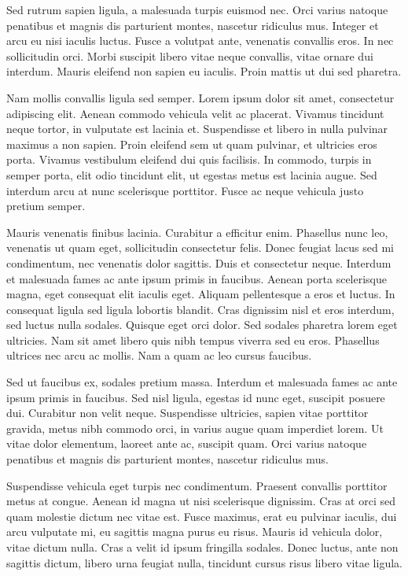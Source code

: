 Sed rutrum sapien ligula, a malesuada turpis euismod nec. Orci varius natoque penatibus et magnis dis parturient montes, nascetur ridiculus mus. Integer et arcu eu nisi iaculis luctus. Fusce a volutpat ante, venenatis convallis eros. In nec sollicitudin orci. Morbi suscipit libero vitae neque convallis, vitae ornare dui interdum. Mauris eleifend non sapien eu iaculis. Proin mattis ut dui sed pharetra.

Nam mollis convallis ligula sed semper. Lorem ipsum dolor sit amet, consectetur adipiscing elit. Aenean commodo vehicula velit ac placerat. Vivamus tincidunt neque tortor, in vulputate est lacinia et. Suspendisse et libero in nulla pulvinar maximus a non sapien. Proin eleifend sem ut quam pulvinar, et ultricies eros porta. Vivamus vestibulum eleifend dui quis facilisis. In commodo, turpis in semper porta, elit odio tincidunt elit, ut egestas metus est lacinia augue. Sed interdum arcu at nunc scelerisque porttitor. Fusce ac neque vehicula justo pretium semper.

Mauris venenatis finibus lacinia. Curabitur a efficitur enim. Phasellus nunc leo, venenatis ut quam eget, sollicitudin consectetur felis. Donec feugiat lacus sed mi condimentum, nec venenatis dolor sagittis. Duis et consectetur neque. Interdum et malesuada fames ac ante ipsum primis in faucibus. Aenean porta scelerisque magna, eget consequat elit iaculis eget. Aliquam pellentesque a eros et luctus. In consequat ligula sed ligula lobortis blandit. Cras dignissim nisl et eros interdum, sed luctus nulla sodales. Quisque eget orci dolor. Sed sodales pharetra lorem eget ultricies. Nam sit amet libero quis nibh tempus viverra sed eu eros. Phasellus ultrices nec arcu ac mollis. Nam a quam ac leo cursus faucibus.

Sed ut faucibus ex, sodales pretium massa. Interdum et malesuada fames ac ante ipsum primis in faucibus. Sed nisl ligula, egestas id nunc eget, suscipit posuere dui. Curabitur non velit neque. Suspendisse ultricies, sapien vitae porttitor gravida, metus nibh commodo orci, in varius augue quam imperdiet lorem. Ut vitae dolor elementum, laoreet ante ac, suscipit quam. Orci varius natoque penatibus et magnis dis parturient montes, nascetur ridiculus mus.

Suspendisse vehicula eget turpis nec condimentum. Praesent convallis porttitor metus at congue. Aenean id magna ut nisi scelerisque dignissim. Cras at orci sed quam molestie dictum nec vitae est. Fusce maximus, erat eu pulvinar iaculis, dui arcu vulputate mi, eu sagittis magna purus eu risus. Mauris id vehicula dolor, vitae dictum nulla. Cras a velit id ipsum fringilla sodales. Donec luctus, ante non sagittis dictum, libero urna feugiat nulla, tincidunt cursus risus libero vitae ligula.

